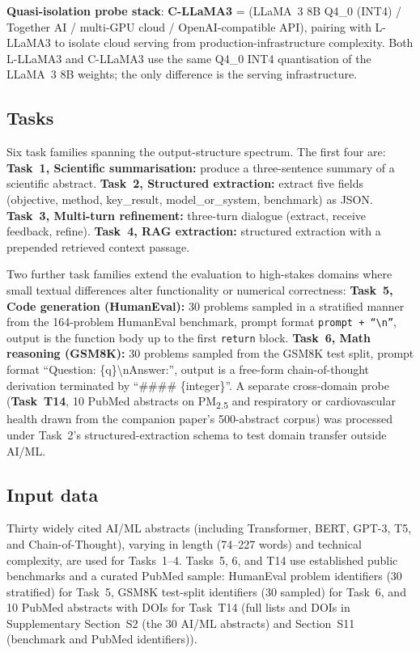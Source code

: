 \documentclass[sn-nature]{sn-jnl}
\begin{document}
\textbf{Quasi-isolation probe stack}:
\textbf{C-LLaMA3} = (LLaMA~3 8B Q4\_0 (INT4)\cite{grattafiori2024llama3} / Together AI / multi-GPU cloud / OpenAI-compatible API), pairing with L-LLaMA3 to isolate cloud serving from production-infrastructure complexity. Both L-LLaMA3 and C-LLaMA3 use the same Q4\_0 INT4 quantisation of the LLaMA~3 8B weights; the only difference is the serving infrastructure.


\subsection{Tasks}\label{subsec:tasks}

Six task families spanning the output-structure spectrum.
The first four are:
\textbf{Task~1, Scientific summarisation:} produce a three-sentence summary of a scientific abstract.
\textbf{Task~2, Structured extraction:} extract five fields (objective, method, key\_result, model\_or\_system, benchmark) as JSON.
\textbf{Task~3, Multi-turn refinement:} three-turn dialogue (extract, receive feedback, refine).
\textbf{Task~4, RAG extraction:} structured extraction with a prepended retrieved context passage.

Two further task families extend the evaluation to high-stakes domains where small textual differences alter functionality or numerical correctness:
\textbf{Task~5, Code generation (HumanEval):} 30 problems sampled in a stratified manner from the 164-problem HumanEval benchmark\cite{chen2021humaneval}, prompt format \texttt{prompt + ``\textbackslash n''}, output is the function body up to the first \texttt{return} block.
\textbf{Task~6, Math reasoning (GSM8K):} 30 problems sampled from the GSM8K test split\cite{cobbe2021gsm8k}, prompt format ``Question: \{q\}\textbackslash nAnswer:'', output is a free-form chain-of-thought derivation terminated by ``\#\#\#\# \{integer\}''.
A separate cross-domain probe (\textbf{Task~T14}, 10 PubMed abstracts on PM\textsubscript{2.5} and respiratory or cardiovascular health drawn from the companion paper's 500-abstract corpus\cite{rover2026evidence}) was processed under Task~2's structured-extraction schema to test domain transfer outside AI/ML.


\subsection{Input data}\label{subsec:input}

Thirty widely cited AI/ML abstracts (including Transformer, BERT, GPT-3, T5, and Chain-of-Thought\cite{vaswani2017attention,devlin2019bert,brown2020language,raffel2020exploring,wei2022chain}), varying in length (74--227 words) and technical complexity, are used for Tasks~1--4.
Tasks~5, 6, and T14 use established public benchmarks and a curated PubMed sample:
HumanEval problem identifiers (30 stratified) for Task~5, GSM8K test-split identifiers (30 sampled) for Task~6, and 10 PubMed abstracts with DOIs for Task~T14 (full lists and DOIs in Supplementary Section~S2 (the 30 AI/ML abstracts) and Section~S11 (benchmark and PubMed identifiers)).
\end{document}
